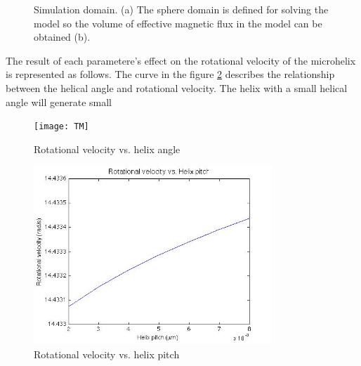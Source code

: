 \documentclass[12pt,a4paper,titlepage]{report}
\begin{document}
\begin{figure}
        \caption[Simulation domain]{Simulation domain. (a) The sphere domain is defined for solving the model so the volume of
effective magnetic flux in the model can be obtained (b).}\label{Simulation domain}

       

\end{figure}

The result of each parametere\rq{}s effect on the rotational velocity of the microhelix is
 represented as follows. The curve in the figure \ref{RV_pitchAngle} describes the relationship between
the helical angle and rotational velocity. 
The helix with a small helical angle will generate small 
 

\begin{figure}
  \centering
    \texttt{[image: TM]}
  \caption[Rotational velocity vs. helix angle]{Rotational velocity vs. helix angle}
  \label{RV_pitchAngle}
\end{figure}





\begin{figure}
  \centering
    \includegraphics[width=0.80\textwidth]{RV_helixPitch}
  \caption[Rotational velocity vs. helix pitch]{Rotational velocity vs. helix pitch }
  \label{RV_helixPitch}
\end{figure}
\end{document}
